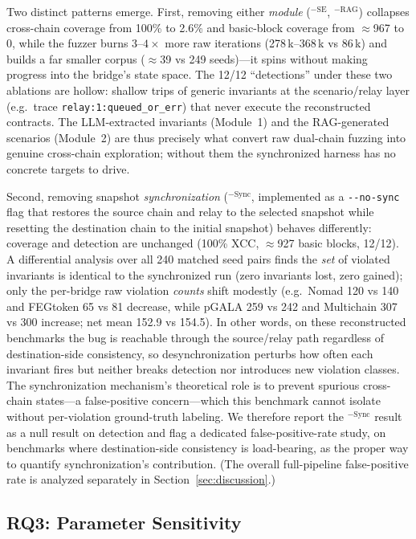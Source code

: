 \documentclass[journal]{IEEEtran}
\begin{document}
Two distinct patterns emerge. First, removing either \emph{module} ($^{-\text{SE}}$, $^{-\text{RAG}}$) collapses cross-chain coverage from 100\% to 2.6\% and basic-block coverage from $\approx$967 to 0, while the fuzzer burns $3$--$4\times$ more raw iterations (278\,k--368\,k vs 86\,k) and builds a far smaller corpus ($\approx$39 vs 249 seeds)---it spins without making progress into the bridge's state space. The 12/12 ``detections'' under these two ablations are hollow: shallow trips of generic invariants at the scenario/relay layer (e.g.\ trace \texttt{relay:1:queued\_or\_err}) that never execute the reconstructed contracts. The LLM-extracted invariants (Module~1) and the RAG-generated scenarios (Module~2) are thus precisely what convert raw dual-chain fuzzing into genuine cross-chain exploration; without them the synchronized harness has no concrete targets to drive.

Second, removing snapshot \emph{synchronization} ($^{-\text{Sync}}$, implemented as a \texttt{-{}-no-sync} flag that restores the source chain and relay to the selected snapshot while resetting the destination chain to the initial snapshot) behaves differently: coverage and detection are unchanged (100\% XCC, $\approx$927 basic blocks, 12/12). A differential analysis over all 240 matched seed pairs finds the \emph{set} of violated invariants is identical to the synchronized run (zero invariants lost, zero gained); only the per-bridge raw violation \emph{counts} shift modestly (e.g.\ Nomad 120 vs 140 and FEGtoken 65 vs 81 decrease, while pGALA 259 vs 242 and Multichain 307 vs 300 increase; net mean 152.9 vs 154.5). In other words, on these reconstructed benchmarks the bug is reachable through the source/relay path regardless of destination-side consistency, so desynchronization perturbs how often each invariant fires but neither breaks detection nor introduces new violation classes. The synchronization mechanism's theoretical role is to prevent spurious cross-chain states---a false-positive concern---which this benchmark cannot isolate without per-violation ground-truth labeling. We therefore report the $^{-\text{Sync}}$ result as a null result on detection and flag a dedicated false-positive-rate study, on benchmarks where destination-side consistency is load-bearing, as the proper way to quantify synchronization's contribution. (The overall full-pipeline false-positive rate is analyzed separately in Section~\ref{sec:discussion}.)

\subsection{RQ3: Parameter Sensitivity}
\end{document}
